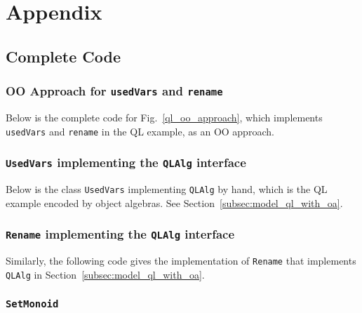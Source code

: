 \section{Appendix}\label{sec:appendix}

\clearpage
\subsection{Complete Code}

\subsubsection{OO Approach for \lstinline{usedVars} and \lstinline{rename}}\label{subsec:appendix_code_oo_approach}

Below is the complete code for Fig.~\ref{ql_oo_approach}, which implements \lstinline{usedVars} and \lstinline{rename} in the QL example, as an OO approach.


\subsubsection{\lstinline{UsedVars} implementing the \lstinline{QLAlg} interface}\label{subsec:appendix_code_usedvars}

Below is the class \lstinline{UsedVars} implementing \lstinline{QLAlg} by hand, which is the QL example encoded by object algebras. See Section~\ref{subsec:model_ql_with_oa}.


\subsubsection{\lstinline{Rename} implementing the \lstinline{QLAlg} interface}\label{subsec:appendix_code_rename}

Similarly, the following code gives the implementation of \lstinline{Rename} that implements \lstinline{QLAlg} in Section~\ref{subsec:model_ql_with_oa}.


\subsubsection{\lstinline{SetMonoid}}\label{subsec:appendix_code_setmonoid}

